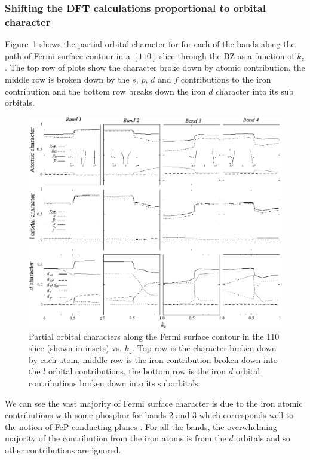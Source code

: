 \subsubsection{Shifting the \ac{DFT} calculations proportional to orbital character}
\label{Sec:ResD:ShiftingDFTPropToOrbitalCharacter}

Figure~\ref{Fig:ResD:Band2DCharacterVsKz} shows the partial orbital character for for each of the bands along the path of Fermi surface contour in a $[110]$ slice through the \BaFeP \ac{BZ} as a function of $k_z$. The top row of plots show the character broke down by atomic contribution, the middle row is broken down by the $s$, $p$, $d$ and $f$ contributions to the iron contribution and the bottom row breaks down the iron $d$ character into its sub orbitals.
\begin{figure}[htbp]
    \begin{center}
        \includegraphics[scale=0.95]{Chapter-dHvABaFe2P2/Figures/AngleDepMeasurements/BandCharacterVsKz/AllBandCharacterVsKz}
        \caption{Partial orbital characters along the Fermi surface contour in the 110 slice (shown in insets) vs. $k_z$. Top row is the character broken down by each atom, middle row is the iron contribution broken down into the $l$ orbital contributions, the bottom row is the iron $d$ orbital contributions broken down into its suborbitals.}
        \label{Fig:ResD:Band2DCharacterVsKz}
    \end{center}
\end{figure}
We can see the vast majority of Fermi surface character is due to the iron atomic contributions with some phosphor for bands 2 and 3 which corresponds well to the notion of FeP conducting planes . For all the bands, the overwhelming majority of the contribution from the iron atoms is from the $d$ orbitals and so other contributions are ignored.

